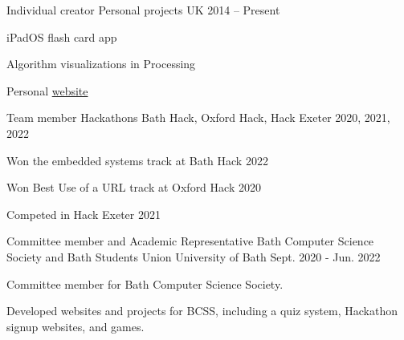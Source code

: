 


\begin{cventries}


\cventry
{Individual creator} %
{Personal projects} %
{UK} %
{2014 -- Present} %
{ %
\begin{cvitems}
\item {iPadOS flash card app}
\item {Algorithm visualizations in Processing}
\item {Personal \href{https://www.alfierichards.com/}{website}}
\end{cvitems}
}


\cventry
{Team member} %
{Hackathons} %
{Bath Hack, Oxford Hack, Hack Exeter} %
{2020, 2021, 2022} %
{ %
\begin{cvitems}
\item {Won the embedded systems track at Bath Hack 2022}
\item {Won Best Use of a URL track at Oxford Hack 2020}
\item {Competed in Hack Exeter 2021}
\end{cvitems}
}


\cventry
{Committee member and Academic Representative} %
{Bath Computer Science Society and Bath Students Union} %
{University of Bath} %
{Sept. 2020 - Jun. 2022} %
{ %
\begin{cvitems}
\item {Committee member for Bath Computer Science Society.}
\item {Developed websites and projects for BCSS, including a quiz system, Hackathon signup websites, and games.}
\end{cvitems}
}


\end{cventries}
